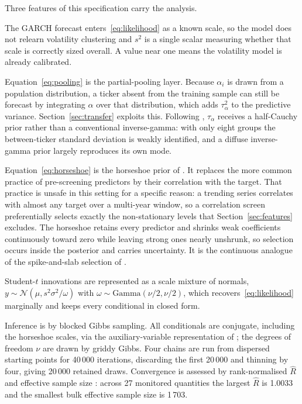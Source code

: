 Three features of this specification carry the analysis.

The GARCH forecast enters~\eqref{eq:likelihood} as a known scale, so the model
does not relearn volatility clustering and $s^2$ is a single scalar measuring
whether that scale is correctly sized overall. A value near one means the
volatility model is already calibrated.

Equation~\eqref{eq:pooling} is the partial-pooling layer. Because $\alpha_i$ is
drawn from a population distribution, a ticker absent from the training sample
can still be forecast by integrating $\alpha$ over that distribution, which adds
$\tau_\alpha^2$ to the predictive variance. Section~\ref{sec:transfer} exploits
this. Following \citet{gelman2006prior}, $\tau_\alpha$ receives a half-Cauchy
prior rather than a conventional inverse-gamma: with only eight groups the
between-ticker standard deviation is weakly identified, and a diffuse
inverse-gamma prior largely reproduces its own mode.

Equation~\eqref{eq:horseshoe} is the horseshoe prior of
\citet{carvalho2010horseshoe}. It replaces the more common practice of
pre-screening predictors by their correlation with the target. That practice is
unsafe in this setting for a specific reason: a trending series correlates with
almost any target over a multi-year window, so a correlation screen
preferentially selects exactly the non-stationary levels that
Section~\ref{sec:features} excludes. The horseshoe retains every predictor and
shrinks weak coefficients continuously toward zero while leaving strong ones
nearly unshrunk, so selection occurs inside the posterior and carries
uncertainty. It is the continuous analogue of the spike-and-slab selection
of \citet{qiu2018multivariate}.

Student-$t$ innovations are represented as a scale mixture of normals,
$y \sim \mathcal{N}(\mu, s^2\sigma^2/\omega)$ with
$\omega \sim \mathrm{Gamma}(\nu/2,\nu/2)$, which recovers~\eqref{eq:likelihood}
marginally and keeps every conditional in closed form.

Inference is by blocked Gibbs sampling. All conditionals are conjugate,
including the horseshoe scales, via the auxiliary-variable representation of
\citet{makalic2016simple}; the degrees of freedom $\nu$ are drawn by griddy
Gibbs. Four chains are run from dispersed starting points for 40\,000 iterations,
discarding the first 20\,000 and thinning by four, giving 20\,000 retained draws.
Convergence is assessed by rank-normalised $\widehat{R}$ and effective sample
size \citep{vehtari2021rank}: across 27 monitored quantities the largest
$\widehat{R}$ is 1.0033 and the smallest bulk effective sample size is 1\,703.

